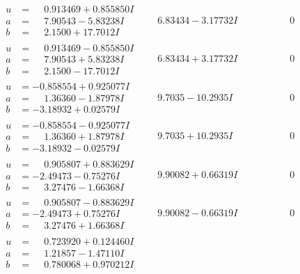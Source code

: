 \documentclass[1p]{elsarticle_modified}
\theoremstyle{definition}
\begin{document}
$$\begin{array}{c|c|c}
\begin{aligned}
u &= \phantom{-}0.913469 + 0.855850 I \\
a &= \phantom{-}7.90543 - 5.83238 I \\
b &= \phantom{-}2.1500 + 17.7012 I\end{aligned}
 & \phantom{-}6.83434 - 3.17732 I & \phantom{-0.000000 } 0 \\ \hline\begin{aligned}
u &= \phantom{-}0.913469 - 0.855850 I \\
a &= \phantom{-}7.90543 + 5.83238 I \\
b &= \phantom{-}2.1500 - 17.7012 I\end{aligned}
 & \phantom{-}6.83434 + 3.17732 I & \phantom{-0.000000 } 0 \\ \hline\begin{aligned}
u &= -0.858554 + 0.925077 I \\
a &= \phantom{-}1.36360 - 1.87978 I \\
b &= -3.18932 + 0.02579 I\end{aligned}
 & \phantom{-}9.7035 - 10.2935 I & \phantom{-0.000000 } 0 \\ \hline\begin{aligned}
u &= -0.858554 - 0.925077 I \\
a &= \phantom{-}1.36360 + 1.87978 I \\
b &= -3.18932 - 0.02579 I\end{aligned}
 & \phantom{-}9.7035 + 10.2935 I & \phantom{-0.000000 } 0 \\ \hline\begin{aligned}
u &= \phantom{-}0.905807 + 0.883629 I \\
a &= -2.49473 - 0.75276 I \\
b &= \phantom{-}3.27476 - 1.66368 I\end{aligned}
 & \phantom{-}9.90082 + 0.66319 I & \phantom{-0.000000 } 0 \\ \hline\begin{aligned}
u &= \phantom{-}0.905807 - 0.883629 I \\
a &= -2.49473 + 0.75276 I \\
b &= \phantom{-}3.27476 + 1.66368 I\end{aligned}
 & \phantom{-}9.90082 - 0.66319 I & \phantom{-0.000000 } 0 \\ \hline\begin{aligned}
u &= \phantom{-}0.723920 + 0.124460 I \\
a &= \phantom{-}1.21857 - 1.47110 I \\
b &= \phantom{-}0.780068 + 0.970212 I\end{aligned}

\end{array}$$
\end{document}
